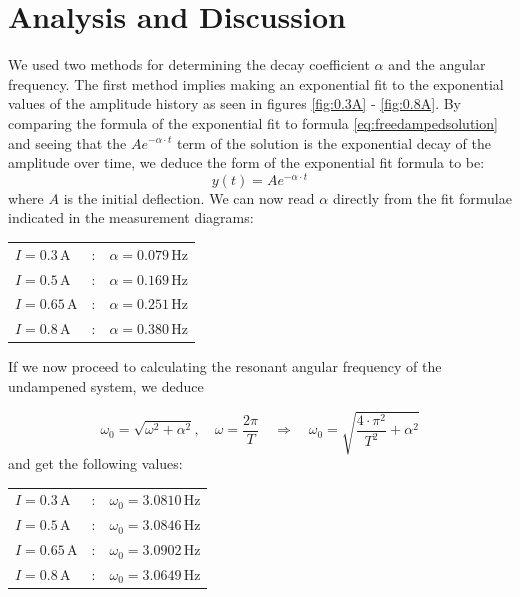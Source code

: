 \documentclass{scrreprt}
\newcommand{\unit}[1]{\ensuremath{\, \mathrm{#1}}}
\begin{document}
\section{Analysis and Discussion}
We used two methods for determining the decay coefficient $\alpha$ and the angular frequency. The first method implies making an exponential fit to the exponential values of the amplitude history as seen in figures \ref{fig:0.3A} - \ref{fig:0.8A}.  By comparing the formula of the exponential fit to formula \ref{eq:freedampedsolution} and seeing that the $Ae^{- \alpha \cdot t}$ term of the solution is the exponential decay of the amplitude over time, we deduce the form of the exponential fit formula to be:
\begin{equation}
y(t) = Ae^{- \alpha \cdot t}
\end{equation}
where $A$ is the initial deflection.
We can now read $\alpha$ directly from the fit formulae indicated in the measurement diagrams:

\begin{table}[H]
\center
\begin{tabular}{lcl}
$I = 0.3 \unit{A}$ &:& $\alpha = 0.079\unit{Hz}$\\
$I = 0.5 \unit{A}$ &:& $\alpha = 0.169\unit{Hz}$\\
$I = 0.65 \unit{A}$ &:& $\alpha = 0.251\unit{Hz}$\\
$I = 0.8 \unit{A}$ &:& $\alpha = 0.380\unit{Hz}$
\end{tabular}
\end{table}

If we now proceed to calculating the resonant angular frequency of the undampened system, we deduce

\begin{equation}
\omega_0 = \sqrt{\omega^2+\alpha^2}, \quad \omega = \frac{2 \pi}{T} \quad \Longrightarrow \quad \omega_0 = \sqrt{\frac{4\cdot\pi^2}{T^2} + \alpha^2}
\end{equation}
and get the following values:

\begin{table}[H]
\center
\begin{tabular}{lcl}
$I = 0.3 \unit{A}$ &:& $\omega_0 = 3.0810\unit{Hz}$\\
$I = 0.5 \unit{A}$ &:& $\omega_0 = 3.0846\unit{Hz}$\\
$I = 0.65 \unit{A}$ &:& $\omega_0 = 3.0902\unit{Hz}$\\
$I = 0.8 \unit{A}$ &:& $\omega_0 = 3.0649\unit{Hz}$
\end{tabular}
\end{table}
\end{document}
